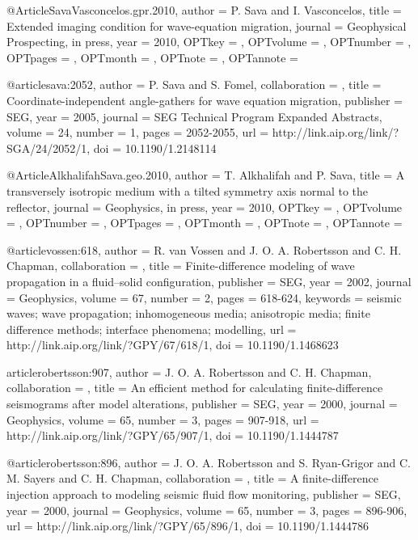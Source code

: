 {@Article{SavaVasconcelos.gpr.2010,
  author = 	 {P. Sava and I. Vasconcelos},
  title = 	 {Extended imaging condition for wave-equation migration},
  journal = 	 {Geophysical Prospecting, in press},
  year = 	 {2010},
  OPTkey = 	 {},
  OPTvolume = 	 {},
  OPTnumber = 	 {},
  OPTpages = 	 {},
  OPTmonth = 	 {},
  OPTnote = 	 {},
  OPTannote = 	 {}
}



@article{sava:2052,
author = {P. Sava and S. Fomel},
collaboration = {},
title = {Coordinate-independent angle-gathers for wave equation migration},
publisher = {SEG},
year = {2005},
journal = {SEG Technical Program Expanded Abstracts},
volume = {24},
number = {1},
pages = {2052-2055},
url = {http://link.aip.org/link/?SGA/24/2052/1},
doi = {10.1190/1.2148114}
}


@Article{AlkhalifahSava.geo.2010,
  author = 	 {T. Alkhalifah and P. Sava},
  title = 	 {A transversely isotropic medium with a tilted
                  symmetry axis normal to the reflector},
  journal = 	 {Geophysics, in press},
  year = 	 {2010},
  OPTkey = 	 {},
  OPTvolume = 	 {},
  OPTnumber = 	 {},
  OPTpages = 	 {},
  OPTmonth = 	 {},
  OPTnote = 	 {},
  OPTannote = 	 {}
}


@article{vossen:618,
author = {R. van Vossen and J. O. A. Robertsson and C. H. Chapman},
collaboration = {},
title = {Finite-difference modeling of wave propagation in a fluid--solid configuration},
publisher = {SEG},
year = {2002},
journal = {Geophysics},
volume = {67},
number = {2},
pages = {618-624},
keywords = {seismic waves; wave propagation; inhomogeneous media; anisotropic media; finite difference methods; interface phenomena; modelling},
url = {http://link.aip.org/link/?GPY/67/618/1},
doi = {10.1190/1.1468623}
}

article{robertsson:907,
author = {J. O. A. Robertsson and C. H. Chapman},
collaboration = {},
title = {An efficient method for calculating finite-difference seismograms after model alterations},
publisher = {SEG},
year = {2000},
journal = {Geophysics},
volume = {65},
number = {3},
pages = {907-918},
url = {http://link.aip.org/link/?GPY/65/907/1},
doi = {10.1190/1.1444787}
}

@article{robertsson:896,
author = {J. O. A. Robertsson and S. Ryan-Grigor and C. M. Sayers and C. H. Chapman},
collaboration = {},
title = {A finite-difference injection approach to modeling seismic fluid flow monitoring},
publisher = {SEG},
year = {2000},
journal = {Geophysics},
volume = {65},
number = {3},
pages = {896-906},
url = {http://link.aip.org/link/?GPY/65/896/1},
doi = {10.1190/1.1444786}
}







}
